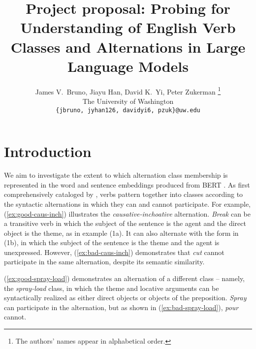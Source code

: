 \documentclass[11pt]{article}
\title{Project proposal: Probing for Understanding of English Verb Classes and Alternations in Large Language Models}
\author{James V.~Bruno, Jiayu Han, David K.~Yi, Peter Zukerman \thanks{ The authors' names appear in alphabetical order.}\\
The University of Washington\\
  \texttt{\{jbruno, jyhan126, davidyi6, pzuk\}@uw.edu}}
\begin{document}
\maketitle

\section{Introduction}

We aim to investigate the extent to which alternation class membership is represented in the word and sentence embeddings produced from BERT \citep{bertpaper}.  As first comprehensively cataloged by \citet{levin1993}, verbs pattern together into classes according to the syntactic alternations in which they can and cannot participate.  For example, (\ref{ex:good-caus-inch}) illustrates the \emph{causative-inchoative} alternation.  \emph{Break} can be a transitive verb in which the subject of the sentence is the agent and the direct object is the theme, as in example (1a).  It can also alternate with the form in (1b), in which the subject of the sentence is the theme and the agent is unexpressed. %
However, (\ref{ex:bad-caus-inch}) demonstrates that \emph{cut} cannot participate in the same alternation, despite its semantic similarity.

\begin{exe}
    \ex
        \label{ex:good-caus-inch}
        \begin{xlist}
        \end{xlist}

    \ex
        \label{ex:bad-caus-inch}
        \begin{xlist}
        \end{xlist}
\end{exe}

(\ref{ex:good-spray-load}) demonstrates an alternation of a different class -- namely, the \emph{spray-load} class, in which the theme and locative arguments can be syntactically realized as either direct objects or objects of the preposition.  \emph{Spray} can participate in the alternation, but as shown in (\ref{ex:bad-spray-load}), \emph{pour} cannot.

\begin{exe}
    \ex 
        \label{ex:good-spray-load}
        \begin{xlist}
        \end{xlist}

    \ex 
        \label{ex:bad-spray-load}
        \begin{xlist}
        \end{xlist}
\end{exe}
\end{document}
